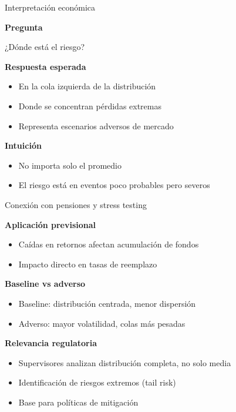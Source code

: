 \documentclass[10pt]{beamer}
\begin{document}
\begin{frame}{Interpretación económica}

\textbf{Pregunta}

\vspace{0.3cm}
¿Dónde está el riesgo?

\vspace{0.4cm}

\textbf{Respuesta esperada}

\begin{itemize}
\item En la cola izquierda de la distribución
\item Donde se concentran pérdidas extremas
\item Representa escenarios adversos de mercado
\end{itemize}

\vspace{0.4cm}

\textbf{Intuición}

\begin{itemize}
\item No importa solo el promedio
\item El riesgo está en eventos poco probables pero severos
\end{itemize}

\end{frame}


\begin{frame}{Conexión con pensiones y stress testing}

\textbf{Aplicación previsional}

\begin{itemize}
\item Caídas en retornos afectan acumulación de fondos
\item Impacto directo en tasas de reemplazo
\end{itemize}

\vspace{0.4cm}

\textbf{Baseline vs adverso}

\begin{itemize}
\item Baseline: distribución centrada, menor dispersión
\item Adverso: mayor volatilidad, colas más pesadas
\end{itemize}

\vspace{0.4cm}

\textbf{Relevancia regulatoria}

\begin{itemize}
\item Supervisores analizan distribución completa, no solo media
\item Identificación de riesgos extremos (tail risk)
\item Base para políticas de mitigación
\end{itemize}

\end{frame}
\end{document}
